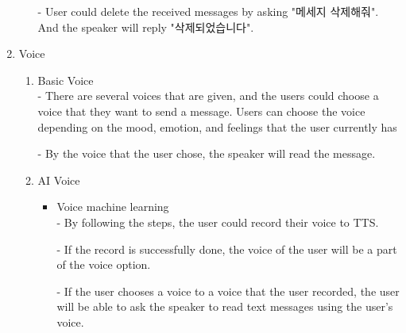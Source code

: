 \documentclass[conference]{IEEEtran}
\begin{document}
\begin{enumerate}
\begin{enumerate}
        - User could delete the received messages by asking "메세지 삭제해줘". And the speaker will reply "삭제되었습니다".
    \end{enumerate}
    
    \item Voice
    \begin{enumerate}
        \item Basic Voice\\
        - There are several voices that are given, and the users could choose a voice that they want to send a message. Users can choose the voice depending on the mood, emotion, and feelings that the user currently has
        
        - By the voice that the user chose, the speaker will read the message.\\
        \item AI Voice
        \begin{itemize}
        \item Voice machine learning\\
        - By following the steps, the user could record their voice to TTS.
        
        - If the record is successfully done, the voice of the user will be a part of the voice option. 
        
        - If the user chooses a voice to a voice that the user recorded, the user will be able to ask the speaker to read text messages using the user's voice.
        \end{itemize}
    \end{enumerate}
\end{enumerate}
\end{document}
